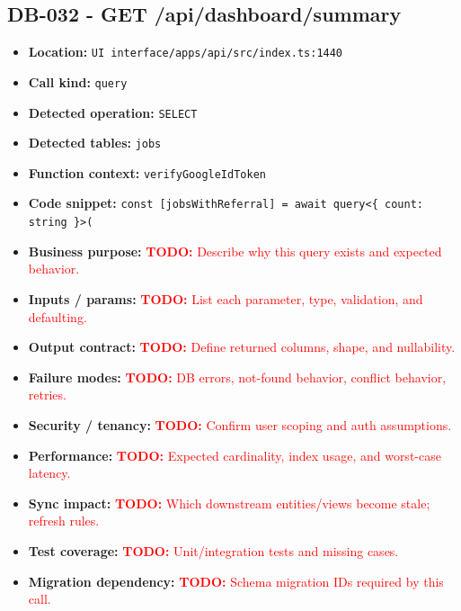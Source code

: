 \documentclass[11pt]{article}
\newcommand{\todoitem}[1]{\textcolor{red}{\textbf{TODO:} #1}}
\begin{document}
\subsection{DB-032 - GET /api/dashboard/summary}
\begin{itemize}[leftmargin=1.5em]
\item \textbf{Location:} \texttt{UI interface/apps/api/src/index.ts:1440}
\item \textbf{Call kind:} \texttt{query}
\item \textbf{Detected operation:} \texttt{SELECT}
\item \textbf{Detected tables:} \texttt{jobs}
\item \textbf{Function context:} \texttt{verifyGoogleIdToken}
\item \textbf{Code snippet:} \texttt{const [jobsWithReferral] = await query<\{ count: string \}>(}
\item \textbf{Business purpose:} \todoitem{Describe why this query exists and expected behavior.}
\item \textbf{Inputs / params:} \todoitem{List each parameter, type, validation, and defaulting.}
\item \textbf{Output contract:} \todoitem{Define returned columns, shape, and nullability.}
\item \textbf{Failure modes:} \todoitem{DB errors, not-found behavior, conflict behavior, retries.}
\item \textbf{Security / tenancy:} \todoitem{Confirm user scoping and auth assumptions.}
\item \textbf{Performance:} \todoitem{Expected cardinality, index usage, and worst-case latency.}
\item \textbf{Sync impact:} \todoitem{Which downstream entities/views become stale; refresh rules.}
\item \textbf{Test coverage:} \todoitem{Unit/integration tests and missing cases.}
\item \textbf{Migration dependency:} \todoitem{Schema migration IDs required by this call.}
\end{itemize}
\end{document}
